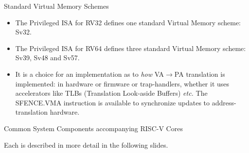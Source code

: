 \documentclass{article}
\newcommand{\etc}{\emph{etc.}}
\begin{document}
\clearpage


\begin{center}
  {\Huge
    Standard Virtual Memory Schemes}

  \vspace*{1in}

  \begin{minipage}[t]{9in}
    \begin{itemize}\Large
 
    \item The Privileged ISA for RV32 defines one standard Virtual Memory scheme: Sv32.

    \item The Privileged ISA for RV64 defines three standard Virtual
      Memory scheme: Sv39, Sv48 and Sv57.

    \item It is a choice for an implementation as to \emph{how}
      VA$\rightarrow$PA translation is implemented: in hardware or
      firmware or trap-handlers, whether it uses accelerators like
      TLBs (Translation Look-aside Buffers) {\etc} The SFENCE.VMA
      instruction is available to synchronize updates to
      address-translation hardware.

    \end{itemize}
  \end{minipage}
\end{center}

\clearpage


\begin{center}
  {\Huge
    Common System Components accompanying RISC-V Cores}

  \vspace*{1in}


  \vspace*{0.5in}

  {\LARGE Each is described in more detail in the following slides.}

\end{center}
\end{document}
